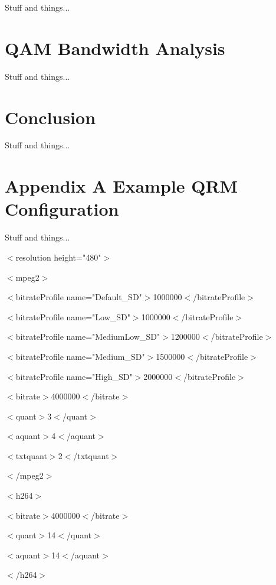 \documentclass{article}
\begin{document}
Stuff and things... 

\section{QAM Bandwidth Analysis}
\label{SECTION-QAMCapacity}

Stuff and things... 

\section{Conclusion}
\label{SECTION-Conclusion}

Stuff and things... 




\newpage

\appendix

\section{Appendix A\: Example QRM Configuration}
\label{APPENDIX-QRMConfig}

Stuff and things... 
\newline
\newline

$<$resolution height="480"$>$

$<$mpeg2$>$

$<$bitrateProfile name="Default\_SD"$>$1000000$<$/bitrateProfile$>$

$<$bitrateProfile name="Low\_SD"$>$1000000$<$/bitrateProfile$>$

$<$bitrateProfile name="MediumLow\_SD"$>$1200000$<$/bitrateProfile$>$

$<$bitrateProfile name="Medium\_SD"$>$1500000$<$/bitrateProfile$>$

$<$bitrateProfile name="High\_SD"$>$2000000$<$/bitrateProfile$>$

$<$bitrate$>$4000000$<$/bitrate$>$

$<$quant$>$3$<$/quant$>$

$<$aquant$>$4$<$/aquant$>$

$<$txtquant$>$2$<$/txtquant$>$

$<$/mpeg2$>$

$<$h264$>$

$<$bitrate$>$4000000$<$/bitrate$>$

$<$quant$>$14$<$/quant$>$

$<$aquant$>$14$<$/aquant$>$

$<$/h264$>$
\newline
\newline
\end{document}
